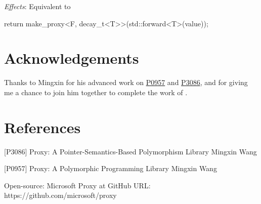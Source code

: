 \documentclass[10pt, a4paper, oneside]{article}
\begin{document}
\textit{Effects}: Equivalent to
\begin{codeblock}
  return make_proxy<F, decay_t<T>>(std::forward<T>(value));
\end{codeblock}

\section{Acknowledgements}
Thanks to Mingxin for his advanced work on \href{https://wg21.link/p0957}{P0957} and \href{https://wg21.link/p3086}{P3086},
and for giving me a chance to join him together to complete the work of .

\section{References}
\begin{thebibliography}{9}
[P3086] Proxy: A Pointer-Semantics-Based Polymorphism Library\smallbreak
Mingxin Wang

[P0957] Proxy: A Polymorphic Programming Library\smallbreak
Mingxin Wang

Open-source: Microsoft Proxy at GitHub\smallbreak
URL: https://github.com/microsoft/proxy
\end{thebibliography}
\end{document}
